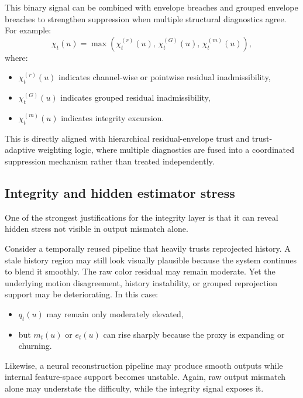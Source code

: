 \documentclass[11pt,letterpaper]{article}
\theoremstyle{gcresult}
\theoremstyle{definition}
\begin{document}
This binary signal can be combined with envelope breaches and grouped envelope breaches to strengthen suppression when multiple structural diagnostics agree. For example:
\begin{equation}
\chi_t(u)=
\max\!\left(
\chi^{(r)}_t(u),\,
\chi^{(G)}_t(u),\,
\chi^{(m)}_t(u)
\right),
\end{equation}
where:
\begin{itemize}[leftmargin=1.5em]
    \item $\chi^{(r)}_t(u)$ indicates channel-wise or pointwise residual inadmissibility,
    \item $\chi^{(G)}_t(u)$ indicates grouped residual inadmissibility,
    \item $\chi^{(m)}_t(u)$ indicates integrity excursion.
\end{itemize}

This is directly aligned with hierarchical residual-envelope trust and trust-adaptive weighting logic, where multiple diagnostics are fused into a coordinated suppression mechanism rather than treated independently. 


\subsection{Integrity and hidden estimator stress}

One of the strongest justifications for the integrity layer is that it can reveal hidden stress not visible in output mismatch alone.

Consider a temporally reused pipeline that heavily trusts reprojected history. A stale history region may still look visually plausible because the system continues to blend it smoothly. The raw color residual may remain moderate. Yet the underlying motion disagreement, history instability, or grouped reprojection support may be deteriorating. In this case:
\begin{itemize}[leftmargin=1.5em]
    \item $q_t(u)$ may remain only moderately elevated,
    \item but $m_t(u)$ or $e_t(u)$ can rise sharply because the proxy is expanding or churning.
\end{itemize}

Likewise, a neural reconstruction pipeline may produce smooth outputs while internal feature-space support becomes unstable. Again, raw output mismatch alone may understate the difficulty, while the integrity signal exposes it.
\end{document}
